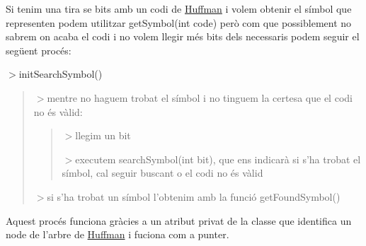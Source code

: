 Si tenim una tira se bits amb un codi de \hyperlink{classHuffman}{Huffman} i volem obtenir el símbol que representen podem utilitzar get\+Symbol(int code) però com que possiblement no sabrem on acaba el codi i no volem llegir més bits dels necessaris podem seguir el següent procés\+:

$>$init\+Search\+Symbol() \begin{quote}


$>$mentre no haguem trobat el símbol i no tinguem la certesa que el codi no és vàlid\+:

\begin{quote}
$>$llegim un bit

$>$executem search\+Symbol(int bit), que ens indicarà si s’ha trobat el símbol, cal seguir buscant o el codi no és vàlid \end{quote}


$>$si s’ha trobat un símbol l’obtenim amb la funció get\+Found\+Symbol() \end{quote}


Aquest procés funciona gràcies a un atribut privat de la classe que identifica un node de l’arbre de \hyperlink{classHuffman}{Huffman} i fuciona com a punter. 